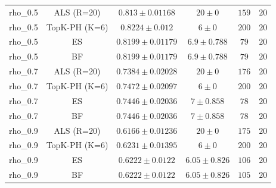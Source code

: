 \begin{longtable}{@{}lccccc@{}}
rho\_0.5 & ALS (R=20) & \(0.813 \pm 0.01168\) & \(20 \pm 0\) & \(159\) & \(20\) \\
rho\_0.5 & TopK-PH (K=6) & \(0.8224 \pm 0.012\) & \(6 \pm 0\) & \(200\) & \(20\) \\
rho\_0.5 & ES & \(0.8199 \pm 0.01179\) & \(6.9 \pm 0.788\) & \(79\) & \(20\) \\
rho\_0.5 & BF & \(0.8199 \pm 0.01179\) & \(6.9 \pm 0.788\) & \(79\) & \(20\) \\
rho\_0.7 & ALS (R=20) & \(0.7384 \pm 0.02028\) & \(20 \pm 0\) & \(176\) & \(20\) \\
rho\_0.7 & TopK-PH (K=6) & \(0.7472 \pm 0.02097\) & \(6 \pm 0\) & \(200\) & \(20\) \\
rho\_0.7 & ES & \(0.7446 \pm 0.02036\) & \(7 \pm 0.858\) & \(78\) & \(20\) \\
rho\_0.7 & BF & \(0.7446 \pm 0.02036\) & \(7 \pm 0.858\) & \(78\) & \(20\) \\
rho\_0.9 & ALS (R=20) & \(0.6166 \pm 0.01236\) & \(20 \pm 0\) & \(175\) & \(20\) \\
rho\_0.9 & TopK-PH (K=6) & \(0.6231 \pm 0.01395\) & \(6 \pm 0\) & \(200\) & \(20\) \\
rho\_0.9 & ES & \(0.6222 \pm 0.0122\) & \(6.05 \pm 0.826\) & \(106\) & \(20\) \\
rho\_0.9 & BF & \(0.6222 \pm 0.0122\) & \(6.05 \pm 0.826\) & \(105\) & \(20\) \\
\bottomrule
\end{longtable}
